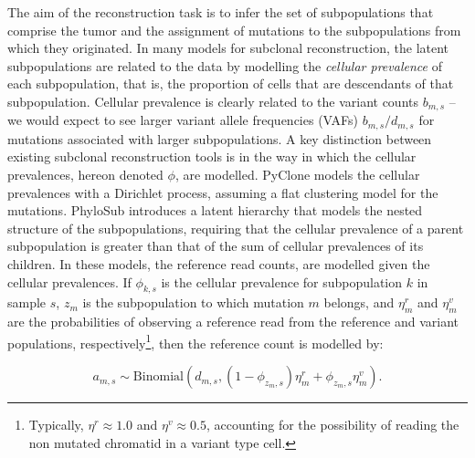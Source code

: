 \documentclass{bioinfo}
\newcommand{\Binomial}{\mathrm{Binomial}}
\begin{document}
\begin{methods}
The aim of the reconstruction task is to infer the set of subpopulations that comprise the tumor and the assignment of mutations to the subpopulations from which they originated.  In many models for subclonal reconstruction, the latent subpopulations are related to the data by modelling the \emph{cellular prevalence} of each subpopulation, that is, the proportion of cells that are descendants of that subpopulation.  Cellular prevalence is clearly related to the variant counts $b_{m,s}$ -- we would expect to see larger variant allele frequencies (VAFs) $b_{m,s}/d_{m,s}$ for mutations associated with larger subpopulations.  A key distinction between existing subclonal reconstruction tools is in the way in which the cellular prevalences, hereon denoted $\phi$, are modelled.  PyClone \cite{Roth2014} models the cellular prevalences with a Dirichlet process, assuming a flat clustering model for the mutations.  PhyloSub \cite{Jiao2014} introduces a latent hierarchy that models the nested structure of the subpopulations, requiring that the cellular prevalence of a parent subpopulation is greater than that of the sum of cellular prevalences of its children.  In these models, the reference read counts, are modelled given the cellular prevalences.  If $\phi_{k,s}$ is the cellular prevalence for subpopulation $k$ in sample $s$, $z_m$ is the subpopulation to which mutation $m$ belongs, and $\eta_m^r$ and $\eta_m^v$ are the probabilities of observing a reference read from the reference and variant populations, respectively\footnote{Typically, $\eta^r \approx 1.0$ and $\eta^v \approx 0.5$, accounting for the possibility of reading the non mutated chromatid in a variant type cell.}, then the reference count is modelled by: 

\begin{equation}
\label{eq:refcount}
a_{m,s} \sim \Binomial(d_{m,s}, (1-\phi_{z_m,s})\eta_m^r + \phi_{z_m,s}\eta_m^v).
\end{equation}


\end{methods}
\end{document}
